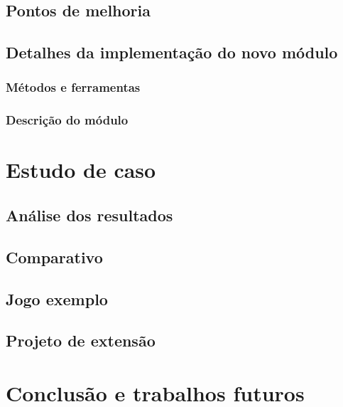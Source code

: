 \documentclass[12pt,twoside,openright,a4paper,english,brazil,sumario=tradicional]{abntex2}
\begin{document}
\section{Pontos de melhoria}
\section{Detalhes da implementação do novo módulo}
\subsection{Métodos e ferramentas}
\subsection{Descrição do módulo}

\chapter{Estudo de caso}
\label{chap:caso}
\section{Análise dos resultados}
\section{Comparativo}
\section{Jogo exemplo}
\section{Projeto de extensão}

\chapter{Conclusão e trabalhos futuros}
\label{chap:conclcsao}
\end{document}
